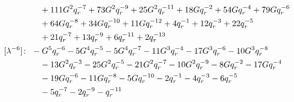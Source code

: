 \begin{align*}
& \quad +111 G^{2} q_r^{-7} +73 G^{2} q_r^{-9} +25 G^{2} q_r^{-11} +18 G q_r^{-2} +54 G q_r^{-4} +79 G q_r^{-6} \\
& \quad +64 G q_r^{-8} +34 G q_r^{-10} +11 G q_r^{-12} +4 q_r^{-1} +12 q_r^{-3} +22 q_r^{-5} \\
& \quad +21 q_r^{-7} +13 q_r^{-9} +6 q_r^{-11} +2 q_r^{-13} \\
[\lambda^{-6}]\colon\ & -G^{5} q_r^{-6} -5 G^{4} q_r^{-5} -5 G^{4} q_r^{-7} -11 G^{3} q_r^{-4} -17 G^{3} q_r^{-6} -10 G^{3} q_r^{-8} \\
& \quad -13 G^{2} q_r^{-3} -25 G^{2} q_r^{-5} -21 G^{2} q_r^{-7} -10 G^{2} q_r^{-9} -8 G q_r^{-2} -17 G q_r^{-4} \\
& \quad -19 G q_r^{-6} -11 G q_r^{-8} -5 G q_r^{-10} -2 q_r^{-1} -4 q_r^{-3} -6 q_r^{-5} \\
& \quad -5 q_r^{-7} -2 q_r^{-9} -q_r^{-11}
\end{align*}

